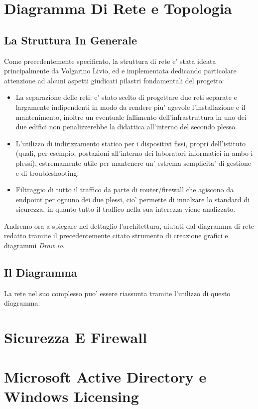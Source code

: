 \documentclass{report}
\begin{document}
    \chapter{Diagramma Di Rete e Topologia}
        \author{Volgarino Livio}
        \section{La Struttura In Generale}
        Come precedentemente specificato, la struttura di rete e' stata ideata principalmente da Volgarino Livio, ed e
         implementata dedicando particolare attenzione ad alcuni aspetti giudicati pilastri fondamentali del progetto:
         \begin{itemize}
             \item La separazione delle reti: e' stato scelto di progettare due reti separate e largamente indipendenti
              in modo da rendere piu' agevole l'installazione e il mantenimento, inoltre un eventuale fallimento
              dell'infrastruttura in uno dei due edifici non penalizzerebbe la didattica all'interno del secondo plesso.
             \item L'utilizzo di indirizzamento statico per i dispositivi fissi, propri dell'istituto (quali, per esempio,
              postazioni all'interno dei laboratori informatici in ambo i plessi), estremamente utile per mantenere un'
              estrema semplicita' di gestione e di troubleshooting.
             \item Filtraggio di tutto il traffico da parte di router/firewall che agiscono da endpoint per ognuno dei due
              plessi, cio' permette di innalzare lo standard di sicurezza, in quanto tutto il traffico nella sua interezza
              viene analizzato.
         \end{itemize}
        Andremo ora a spiegare nel dettaglio l'architettura, aiutati dal diagramma di rete redatto tramite il precedentemente
         citato strumento di creazione grafici e diagrammi \emph{Draw.io}.
        \section{Il Diagramma}
        La rete nel suo complesso puo' essere riassunta tramite l'utilizzo di questo diagramma:
    \chapter{Sicurezza E Firewall}
        \author{Serena Thomas}
    \chapter{Microsoft Active Directory e Windows Licensing}
        \author{Catone Mario}
\end{document}
